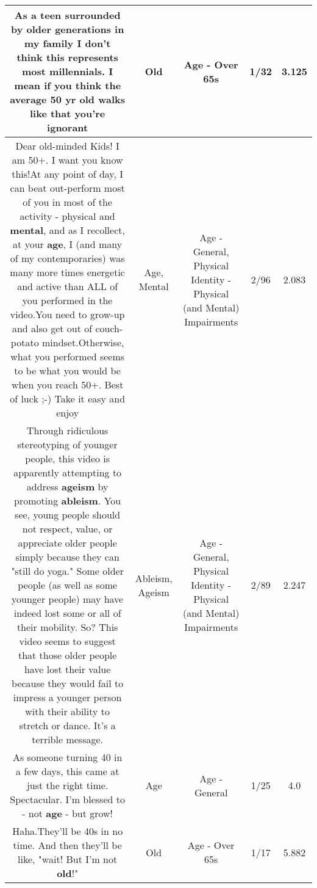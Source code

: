 \documentclass[11pt]{article}
\newlength\mylength
\begin{document}
\begin{center}
\begin{longtable}{|C{.65\mylength}|C{.30\mylength}|C{.12\mylength}|C{.12\mylength}|C{.12\mylength}|}
  \small As a teen surrounded by older generations in my family I don't think this represents most millennials. I mean if you think the average 50 yr \textbf{old} walks like that you're ignorant\normalsize   & Old & Age - Over 65s & 1/32 & 3.125 \\  \hline
  \small Dear old-minded Kids!  I am 50+.  I want you know this!At any point of day, I can beat  out-perform  most of you  in most of the  activity - physical and \textbf{mental}, and as I recollect, at your \textbf{age}, I (and many of my contemporaries) was many more times energetic and active than ALL of you performed in the video.You need to grow-up and also get out of couch-potato mindset.Otherwise, what you performed seems to be what you would be when you reach 50+. Best of luck ;-) Take it easy and enjoy\normalsize   & Age, Mental & Age - General, Physical Identity - Physical (and Mental) Impairments & 2/96 & 2.083 \\  \hline
  \small Through ridiculous stereotyping of younger people, this video is apparently attempting to address \textbf{ageism} by promoting \textbf{ableism}. You see, young people should not respect, value, or appreciate older people simply because they can "still do yoga." Some older people (as well as some younger people) may have indeed lost some or all of their mobility. So? This video seems to suggest that those older people have lost their value because they would fail to impress a younger person with their ability to stretch or dance. It's a terrible message.\normalsize   & Ableism, Ageism & Age - General, Physical Identity - Physical (and Mental) Impairments & 2/89 & 2.247 \\  \hline
  \small As someone turning 40 in a few days, this came at just the right time. Spectacular. I'm blessed to - not \textbf{age} - but grow!\normalsize   & Age & Age - General & 1/25 & 4.0 \\  \hline
  \small Haha.They'll be 40s in no time. And then they'll be like, "wait!  But I'm not \textbf{old}!"\normalsize   & Old & Age - Over 65s & 1/17 & 5.882 \\  \hline

\end{longtable}
\end{center}
\end{document}
